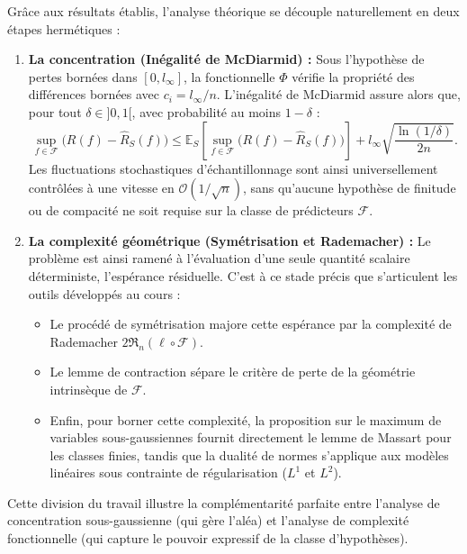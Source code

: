 Grâce aux résultats établis, l'analyse théorique se découple naturellement en deux étapes hermétiques :

\begin{enumerate}
    \item \textbf{La concentration (Inégalité de McDiarmid) :}  
    Sous l'hypothèse de pertes bornées dans $[0, l_\infty]$, la fonctionnelle $\Phi$ vérifie la propriété des différences bornées avec $c_i = l_\infty / n$. L'inégalité de McDiarmid assure alors que, pour tout $\delta \in ]0, 1[$, avec probabilité au moins $1 - \delta$ :
    \begin{equation}
        \sup_{f \in \mathcal{F}} \big( R(f) - \hat{R}_S(f) \big) \leqslant \mathbb{E}_S \left[ \sup_{f \in \mathcal{F}} \big( R(f) - \hat{R}_S(f) \big) \right] + l_\infty \sqrt{\frac{\ln(1/\delta)}{2n}}.
    \end{equation}
    Les fluctuations stochastiques d'échantillonnage sont ainsi universellement contrôlées à une vitesse en $\mathcal{O}(1/\sqrt{n})$, sans qu'aucune hypothèse de finitude ou de compacité ne soit requise sur la classe de prédicteurs $\mathcal{F}$.

    \item \textbf{La complexité géométrique (Symétrisation et Rademacher) :}  
    Le problème est ainsi ramené à l'évaluation d'une seule quantité scalaire déterministe, l'espérance résiduelle. C'est à ce stade précis que s'articulent les outils développés au cours :
    \begin{itemize}
        \item Le procédé de symétrisation majore cette espérance par la complexité de Rademacher $2\mathfrak{R}_n(\ell \circ \mathcal{F})$.
        \item Le lemme de contraction sépare le critère de perte de la géométrie intrinsèque de $\mathcal{F}$.
        \item Enfin, pour borner cette complexité, la proposition sur le maximum de variables sous-gaussiennes fournit directement le lemme de Massart pour les classes finies, tandis que la dualité de normes s'applique aux modèles linéaires sous contrainte de régularisation ($L^1$ et $L^2$).
    \end{itemize}
\end{enumerate}

Cette division du travail illustre la complémentarité parfaite entre l'analyse de concentration sous-gaussienne (qui gère l'aléa) et l'analyse de complexité fonctionnelle (qui capture le pouvoir expressif de la classe d'hypothèses).